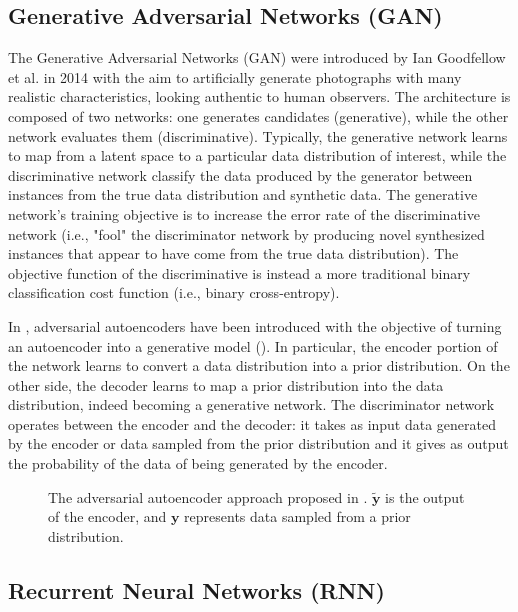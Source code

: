 \subsection{Generative Adversarial Networks (GAN)}
\label{ssec:GAN}
The Generative Adversarial Networks (GAN) were introduced by Ian Goodfellow et al. in 2014 \cite{goodfellow2014generative} with the aim to artificially generate photographs with many realistic characteristics, looking authentic to human observers. The architecture is composed of two networks: one generates candidates (generative), while the other network evaluates them (discriminative). Typically, the generative network learns to map from a latent space to a particular data distribution of interest, while the discriminative network classify the data produced by the generator between instances from the true data distribution and synthetic data. The generative network's training objective is to increase the error rate of the discriminative network (i.e., "fool" the discriminator network by producing novel synthesized instances that appear to have come from the true data distribution). The objective function of the discriminative is instead a more traditional binary classification cost function (i.e., binary cross-entropy). 

In \cite{makhzani2015adversarial}, adversarial autoencoders have been introduced with the objective of turning an autoencoder into a generative model (). In particular, the encoder portion of the network learns to convert a data distribution into a prior distribution. On the other side, the decoder learns to map a prior distribution into the data distribution, indeed becoming a generative network. The discriminator network operates between the encoder and the decoder: it takes as input data generated by the encoder or data sampled from the prior distribution and it gives as output the probability of the data of being generated by the encoder. 

\begin{figure}[h]
	\centering
	\def\svgwidth{0.5\columnwidth}
	
	\caption[Generative Adversarial Networks]{The adversarial autoencoder approach proposed in \cite{makhzani2015adversarial}. $\tilde{\boldsymbol{y}}$ is the output of the encoder, and $\boldsymbol{y}$ represents data sampled from a prior distribution.} 
	\label{fig:adv_goodfellow}
\end{figure}


\subsection{Recurrent Neural Networks (RNN)}

